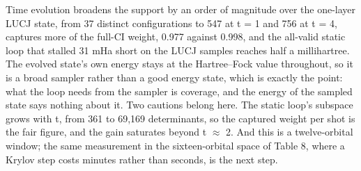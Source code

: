 \documentclass[11pt]{article}
\begin{document}
Time evolution broadens the support by an order of magnitude over the one-layer LUCJ state, from 37 distinct configurations to 547 at t = 1 and 756 at t = 4, captures more of the full-CI weight, 0.977 against 0.998, and the all-valid static loop that stalled 31 mHa short on the LUCJ samples reaches half a millihartree. The evolved state's own energy stays at the Hartree--Fock value throughout, so it is a broad sampler rather than a good energy state, which is exactly the point: what the loop needs from the sampler is coverage, and the energy of the sampled state says nothing about it. Two cautions belong here. The static loop's subspace grows with t, from 361 to 69,169 determinants, so the captured weight per shot is the fair figure, and the gain saturates beyond t $\approx$ 2. And this is a twelve-orbital window; the same measurement in the sixteen-orbital space of Table 8, where a Krylov step costs minutes rather than seconds, is the next step.
\end{document}
